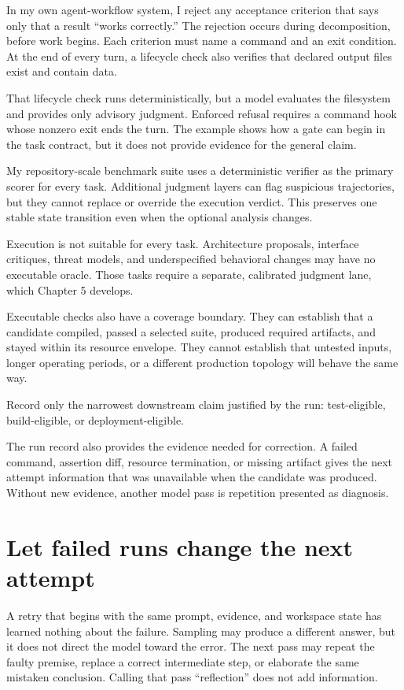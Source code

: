 In my own agent-workflow system, I reject any acceptance criterion that says only that a result ``works correctly.'' The rejection occurs during decomposition, before work begins. Each criterion must name a command and an exit condition. At the end of every turn, a lifecycle check also verifies that declared output files exist and contain data.

That lifecycle check runs deterministically, but a model evaluates the filesystem and provides only advisory judgment. Enforced refusal requires a command hook whose nonzero exit ends the turn. The example shows how a gate can begin in the task contract, but it does not provide evidence for the general claim.

My repository-scale benchmark suite uses a deterministic verifier as the primary scorer for every task. Additional judgment layers can flag suspicious trajectories, but they cannot replace or override the execution verdict. This preserves one stable state transition even when the optional analysis changes.

Execution is not suitable for every task. Architecture proposals, interface critiques, threat models, and underspecified behavioral changes may have no executable oracle. Those tasks require a separate, calibrated judgment lane, which Chapter 5 develops.

Executable checks also have a coverage boundary. They can establish that a candidate compiled, passed a selected suite, produced required artifacts, and stayed within its resource envelope. They cannot establish that untested inputs, longer operating periods, or a different production topology will behave the same way.

Record only the narrowest downstream claim justified by the run: test-eligible, build-eligible, or deployment-eligible.

The run record also provides the evidence needed for correction. A failed command, assertion diff, resource termination, or missing artifact gives the next attempt information that was unavailable when the candidate was produced. Without new evidence, another model pass is repetition presented as diagnosis.

\section{Let failed runs change the next attempt}\label{let-failed-runs-change-the-next-attempt}

A retry that begins with the same prompt, evidence, and workspace state has learned nothing about the failure. Sampling may produce a different answer, but it does not direct the model toward the error. The next pass may repeat the faulty premise, replace a correct intermediate step, or elaborate the same mistaken conclusion. Calling that pass ``reflection'' does not add information.

